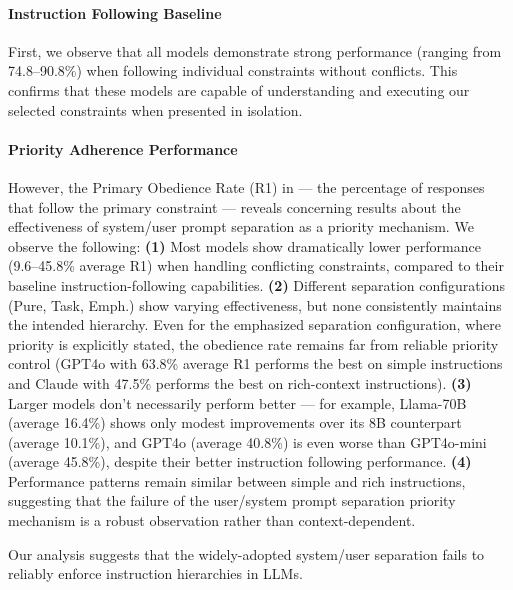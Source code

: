 \paragraph{Instruction Following Baseline} First, we observe that all models demonstrate strong performance (ranging from 74.8--90.8\%) when following individual constraints without conflicts. This confirms that these models are capable of understanding and executing our selected constraints when presented in isolation.


\paragraph{Priority Adherence Performance} However, the Primary Obedience Rate (R1)  in  --- the percentage of responses that follow the primary constraint --- reveals concerning results about the effectiveness of system/user prompt separation as a priority mechanism. We observe the following: 
\textbf{(1)} Most models show dramatically lower performance (9.6--45.8\% average R1) when handling conflicting constraints, compared to their baseline instruction-following capabilities.
\textbf{(2)} Different separation configurations (Pure, Task, Emph.) show varying effectiveness, but none consistently maintains the intended hierarchy. Even for the emphasized separation configuration, where priority is explicitly stated, the obedience rate remains far from reliable priority control (GPT4o with 63.8\% average R1 performs the best on simple instructions and Claude with 47.5\% performs the best on rich-context instructions).
\textbf{(3)} Larger models don't necessarily perform better --- for example, Llama-70B (average 16.4\%) shows only modest improvements over its 8B counterpart (average 10.1\%), and GPT4o (average 40.8\%) is even worse than GPT4o-mini (average 45.8\%), despite their better instruction following performance.
\textbf{(4)} Performance patterns remain similar between simple and rich instructions, suggesting that the failure of the user/system prompt separation priority mechanism is a robust observation rather than context-dependent.

Our analysis suggests that the widely-adopted system/user separation fails to reliably enforce instruction hierarchies in LLMs.

